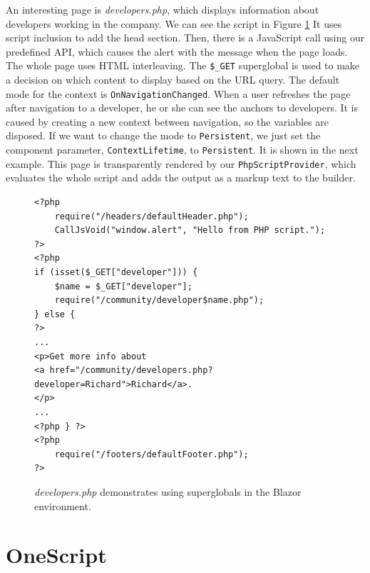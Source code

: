 \par
An interesting page is \textit{developers.php}, which displays information about developers working in the company.
We can see the script in Figure \ref{img25:developer}
It uses script inclusion to add the head section.
Then, there is a JavaScript call using our predefined API, which causes the alert with the message when the page loads.
The whole page uses HTML interleaving.
The \texttt{\$\_GET} superglobal is used to make a decision on which content to display based on the URL query.
The default mode for the context is \texttt{OnNavigationChanged}.
When a user refreshes the page after navigation to a developer, he or she can see the anchors to developers.
It is caused by creating a new context between navigation, so the variables are disposed.
If we want to change the mode to \texttt{Persistent}, we just set the component parameter, \texttt{ContextLifetime}, to \texttt{Persistent}.
It is shown in the next example.
This page is transparently rendered by our \texttt{PhpScriptProvider}, which evaluates the whole script and adds the output as a markup text to the builder.
\par
\begin{figure}
\begin{lstlisting}
<?php
    require("/headers/defaultHeader.php");
    CallJsVoid("window.alert", "Hello from PHP script.");
?>
<?php
if (isset($_GET["developer"])) { 
    $name = $_GET["developer"];
    require("/community/developer$name.php");
} else {
?>
...
<p>Get more info about 
<a href="/community/developers.php?developer=Richard">Richard</a>.
</p>
...
<?php } ?>
<?php
    require("/footers/defaultFooter.php");
?>
\end{lstlisting}
\caption{\textit{developers.php} demonstrates using superglobals in the Blazor environment.}
\label{img25:developer}
\end{figure}

\section{OneScript}

